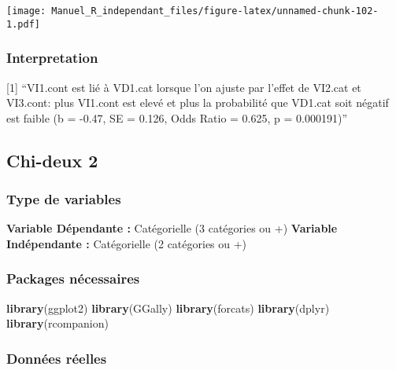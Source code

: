 \documentclass[
]{book}
\newenvironment{Shaded}{\begin{snugshade}}{\end{snugshade}}
\newcommand{\KeywordTok}[1]{\textcolor[rgb]{0.13,0.29,0.53}{\textbf{#1}}}
\newcommand{\NormalTok}[1]{#1}
\begin{document}
\texttt{[image: Manuel\_R\_independant\_files/figure-latex/unnamed-chunk-102-1.pdf]}

\hypertarget{interpretation-11}{%
\subsubsection{Interpretation}\label{interpretation-11}}

{[}1{]} ``VI1.cont est lié à VD1.cat lorsque l'on ajuste par l'effet de VI2.cat et VI3.cont: plus VI1.cont est elevé et plus la probabilité que VD1.cat soit négatif est faible (b = -0.47, SE = 0.126, Odds Ratio = 0.625, p = 0.000191)''

\hypertarget{chi-deux-2}{%
\subsection{Chi-deux 2}\label{chi-deux-2}}

\hypertarget{type-de-variables-12}{%
\subsubsection{Type de variables}\label{type-de-variables-12}}

\textbf{Variable Dépendante :} Catégorielle (3 catégories ou +)
\textbf{Variable Indépendante :} Catégorielle (2 catégories ou +)

\hypertarget{packages-nuxe9cessaires-12}{%
\subsubsection{Packages nécessaires}\label{packages-nuxe9cessaires-12}}

\begin{Shaded}
\begin{Highlighting}[]
\KeywordTok{library}\NormalTok{(ggplot2)}
\KeywordTok{library}\NormalTok{(GGally)}
\KeywordTok{library}\NormalTok{(forcats)}
\KeywordTok{library}\NormalTok{(dplyr)}
\KeywordTok{library}\NormalTok{(rcompanion)}
\end{Highlighting}
\end{Shaded}

\hypertarget{donnuxe9es-ruxe9elles-12}{%
\subsubsection{Données réelles}\label{donnuxe9es-ruxe9elles-12}}
\end{document}
